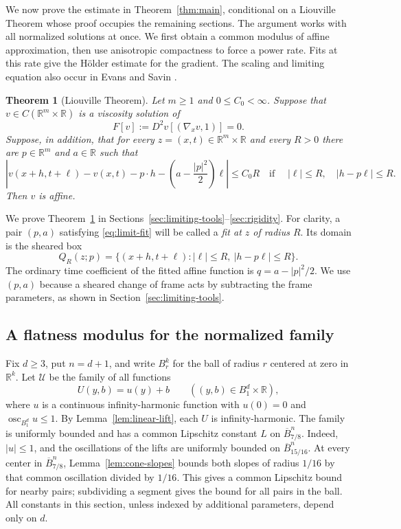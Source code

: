 \documentclass[11pt]{article}
\numberwithin{equation}{section}
\newtheorem{theorem}{Theorem}[section]
\theoremstyle{definition}
\theoremstyle{remark}
\newcommand{\R}{\mathbb{R}}
\DeclareMathOperator{\osc}{osc}
\begin{document}
We now prove the estimate in Theorem~\ref{thm:main}, conditional on a Liouville Theorem whose proof occupies the remaining sections. The argument works with all normalized solutions at once. We first obtain a common modulus of affine approximation, then use anisotropic compactness to force a power rate. Fits at this rate give the H\"older estimate for the gradient. The scaling and limiting equation also occur in Evans and Savin \cite[Sections~2.3--2.4]{EvansSavin2008}.

\begin{theorem}[Liouville Theorem]\label{thm:liouville}
Let $m\ge1$ and $0\le C_0<\infty$. Suppose that $v\in C(\R^m\times\R)$ is a viscosity solution of
\begin{equation}\label{eq:limit-pde}
  F[v]:=D^2v[(\nabla_xv,1)]=0.
\end{equation}
Suppose, in addition, that for every $z=(x,t)\in\R^m\times\R$ and every $R>0$ there are $p\in\R^m$ and $a\in\R$ such that
\begin{equation}\label{eq:limit-fit}
  \left|v(x+h,t+\ell)-v(x,t)-p\cdot h
       -\left(a-\frac{|p|^2}{2}\right)\ell\right|\le C_0R
  \quad\text{if }\quad |\ell|\le R,\quad |h-p\ell|\le R.
\end{equation}
Then $v$ is affine.
\end{theorem}

We prove Theorem~\ref{thm:liouville} in Sections~\ref{sec:limiting-tools}--\ref{sec:rigidity}. For clarity, a pair $(p,a)$ satisfying \eqref{eq:limit-fit} will be called a \emph{fit at $z$ of radius $R$}. Its domain is the sheared box
\[
  Q_R(z;p)=\{(x+h,t+\ell): |\ell|\le R,\ |h-p\ell|\le R\}.
\]
The ordinary time coefficient of the fitted affine function is $q=a-|p|^2/2$. We use $(p,a)$ because a sheared change of frame acts by subtracting the frame parameters, as shown in Section~\ref{sec:limiting-tools}.

\subsection{A flatness modulus for the normalized family}

Fix $d\ge3$, put $n=d+1$, and write $B_r^k$ for the ball of radius $r$ centered at zero in $\R^k$. Let $\mathcal U$ be the family of all functions
\[
  U(y,b)=u(y)+b\qquad ((y,b)\in B_1^d\times\R),
\]
where $u$ is a continuous infinity-harmonic function with
$u(0)=0$ and $\osc_{B_1^d}u\le1$. By Lemma~\ref{lem:linear-lift}, each $U$ is infinity-harmonic. The family is uniformly bounded and has a common Lipschitz constant $L$ on $\overline B_{7/8}^n$. Indeed, $|u|\le1$, and the oscillations of the lifts are uniformly bounded on $\overline B_{15/16}^n$. At every center in $\overline B_{7/8}^n$, Lemma~\ref{lem:cone-slopes} bounds both slopes of radius $1/16$ by that common oscillation divided by $1/16$. This gives a common Lipschitz bound for nearby pairs; subdividing a segment gives the bound for all pairs in the ball. All constants in this section, unless indexed by additional parameters, depend only on $d$.
\end{document}
